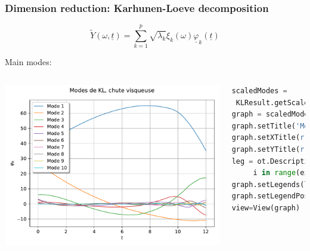 \documentclass{beamer}
\begin{document}

\begin{frame}[containsverbatim]
\frametitle{Dimension reduction: Karhunen-Loeve decomposition}

\scriptsize 

\begin{equation*}
\tilde{Y}(\omega, \underline{t}) =  \sum_{k=1}^{p} \sqrt{\lambda_k} \xi_k(\omega)\underline{\varphi}_k(\underline{t})
\end{equation*}

Main modes:

\begin{columns}

    \includegraphics[width=1.\textwidth]{figures/Modes.pdf}
    
        
\tiny
\begin{lstlisting}[language=Python, numbers = none]
scaledModes =
 KLResult.getScaledModesAsProcessSample()
graph = scaledModes.drawMarginal(0)
graph.setTitle('Modes de KL, chute visqueuse')
graph.setXTitle(r'$t$')
graph.setYTitle(r'$\varphi_k$')
leg = ot.Description([ 'Mode '+str(i +1) for
	 i in range(eigenValues.getDimension()) ])
graph.setLegends(leg)
graph.setLegendPosition('topleft')
view=View(graph)
\end{lstlisting}

\end{columns}


\end{frame}
\end{document}
